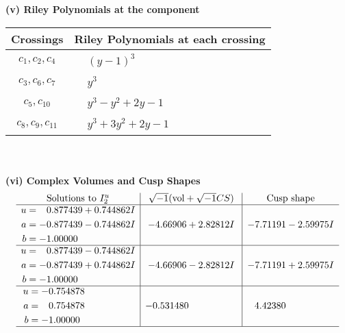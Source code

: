 \documentclass[1p]{elsarticle_modified}
\theoremstyle{definition}
\newcommand{\I}{\sqrt{-1}}
\begin{document}
\newpage\renewcommand{\arraystretch}{1}
\flushleft \textbf{(v) Riley Polynomials at the component}\newline \\
\begin{tabular}{m{50pt}|m{274pt}}
Crossings & \hspace{64pt}Riley Polynomials at each crossing \\
\hline $$\begin{aligned}c_{1},c_{2},c_{4}\end{aligned}$$&$\begin{aligned}
&(y-1)^3
\end{aligned}$\\
\hline $$\begin{aligned}c_{3},c_{6},c_{7}\end{aligned}$$&$\begin{aligned}
&y^3
\end{aligned}$\\
\hline $$\begin{aligned}c_{5},c_{10}\end{aligned}$$&$\begin{aligned}
&y^3- y^2+2 y-1
\end{aligned}$\\
\hline $$\begin{aligned}c_{8},c_{9},c_{11}\end{aligned}$$&$\begin{aligned}
&y^3+3 y^2+2 y-1
\end{aligned}$\\
\hline
\end{tabular}\\~\\
\newpage\flushleft \textbf{(vi) Complex Volumes and Cusp Shapes}
$$\begin{array}{c|c|c}  
\text{Solutions to }I^u_{2}& \I (\text{vol} + \sqrt{-1}CS) & \text{Cusp shape}\\
 \hline 
\begin{aligned}
u &= \phantom{-}0.877439 + 0.744862 I \\
a &= -0.877439 - 0.744862 I \\
b &= -1.00000\phantom{ +0.000000I}\end{aligned}
 & -4.66906 + 2.82812 I & -7.71191 - 2.59975 I \\ \hline\begin{aligned}
u &= \phantom{-}0.877439 - 0.744862 I \\
a &= -0.877439 + 0.744862 I \\
b &= -1.00000\phantom{ +0.000000I}\end{aligned}
 & -4.66906 - 2.82812 I & -7.71191 + 2.59975 I \\ \hline\begin{aligned}
u &= -0.754878\phantom{ +0.000000I} \\
a &= \phantom{-}0.754878\phantom{ +0.000000I} \\
b &= -1.00000\phantom{ +0.000000I}\end{aligned}
 & -0.531480\phantom{ +0.000000I} & \phantom{-}4.42380\phantom{ +0.000000I}\\
 \hline 
 \end{array}$$\newpage
\end{document}
